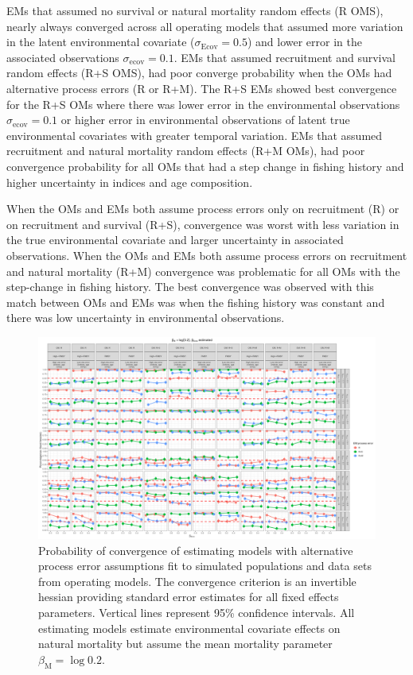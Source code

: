 \documentclass[
  12pt,
]{article}
\begin{document}
EMs that assumed no survival or natural mortality random effects (R
OMS), nearly always converged across all operating models that assumed
more variation in the latent environmental covariate
(\(\sigma_\text{Ecov} = 0.5\)) and lower error in the associated
observations \(\sigma_\text{ecov} = 0.1\). EMs that assumed recruitment
and survival random effects (R+S OMS), had poor converge probability
when the OMs had alternative process errors (R or R+M). The R+S EMs
showed best convergence for the R+S OMs where there was lower error in
the environmental observations \(\sigma_\text{ecov} = 0.1\) or higher
error in environmental observations of latent true environmental
covariates with greater temporal variation. EMs that assumed recruitment
and natural mortality random effects (R+M OMs), had poor convergence
probability for all OMs that had a step change in fishing history and
higher uncertainty in indices and age composition.

When the OMs and EMs both assume process errors only on recruitment (R)
or on recruitment and survival (R+S), convergence was worst with less
variation in the true environmental covariate and larger uncertainty in
associated observations. When the OMs and EMs both assume process errors
on recruitment and natural mortality (R+M) convergence was problematic
for all OMs with the step-change in fishing history. The best
convergence was observed with this match between OMs and EMs was when
the fishing history was constant and there was low uncertainty in
environmental observations.

\begin{landscape}
\begin{figure}
\caption{Probability of convergence of estimating models with alternative process error assumptions fit to simulated populations and data sets from operating models. The convergence criterion is an invertible hessian providing standard error estimates for all fixed effects parameters. Vertical lines represent 95\% confidence intervals. All estimating models estimate environmental covariate effects on natural mortality but assume the mean mortality parameter $\beta_\text{M} = \log 0.2$.}\label{convergence_M_fixed}
\begin{center}
\includegraphics[height = \textheight]{proportion_good_hessian_ecov_effect_est_M_fixed.png}
\end{center}
\end{figure}
\end{landscape}
\end{document}
